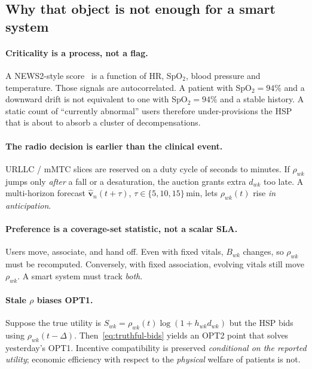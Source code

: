 \documentclass[journal,a4paper,10pt]{IEEEtran}
\begin{document}
\subsection{Why that object is not enough for a smart system}
\paragraph{Criticality is a process, not a flag.}
A NEWS2-style score~\cite{royal2017news2} is a function of HR, SpO\(_2\), blood pressure and temperature. Those signals are autocorrelated. A patient with SpO\(_2=94\%\) and a downward drift is not equivalent to one with SpO\(_2=94\%\) and a stable history. A static count of ``currently abnormal'' users therefore under-provisions the HSP that is about to absorb a cluster of decompensations.

\paragraph{The radio decision is earlier than the clinical event.}
URLLC / mMTC slices are reserved on a duty cycle of seconds to minutes. If \(\rho_{wk}\) jumps only \emph{after} a fall or a desaturation, the auction grants extra \(d_{wk}\) too late. A multi-horizon forecast \(\hat{\mathbf{v}}_n(t+\tau)\), \(\tau\in\{5,10,15\}\)\,min, lets \(\rho_{wk}(t)\) rise \emph{in anticipation}.

\paragraph{Preference is a coverage-set statistic, not a scalar SLA.}
Users move, associate, and hand off. Even with fixed vitals, \(B_{wk}\) changes, so \(\rho_{wk}\) must be recomputed. Conversely, with fixed association, evolving vitals still move \(\rho_{wk}\). A smart system must track \emph{both}.

\paragraph{Stale \(\rho\) biases OPT1.}
Suppose the true utility is \(S_{wk}=\rho_{wk}(t)\log(1+h_{wk}d_{wk})\) but the HSP bids using \(\rho_{wk}(t-\Delta)\). Then~\eqref{eq:truthful-bids} yields an OPT2 point that solves yesterday's OPT1. Incentive compatibility is preserved \emph{conditional on the reported utility}; economic efficiency with respect to the \emph{physical} welfare of patients is not.
\end{document}
